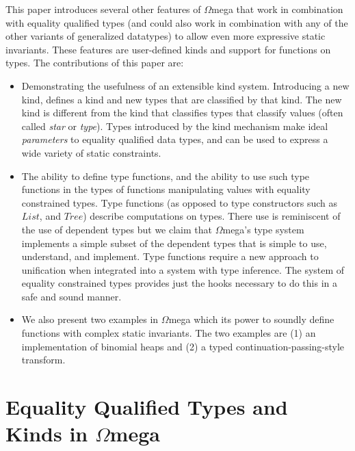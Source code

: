 \documentclass[10pt]{article}
\newcommand{\Conid}[1]{\mathit{#1}}
\newcommand{\Wmega}{\ensuremath{\Omega}mega}
\newcommand{\edit}[1]{\marginpar{\raggedright\footnotesize{#1}}}
\begin{document}
This paper introduces several other features of \Wmega{} that work in
combination with equality qualified types (and could also work in combination
with any of the other variants of generalized datatypes) to allow even more
expressive static invariants. These features are user-defined kinds and 
support for functions on types.  The contributions of this paper are:

\begin{itemize} 

\item Demonstrating the usefulness of an extensible kind system. Introducing a new
kind, defines a kind and new types that are classified by that kind.
The new kind is different from the kind that classifies types that
classify values (often called {\it star} or {\it type}). Types introduced
by the kind mechanism make ideal {\em parameters} to equality qualified
data types, and can be used to express a wide variety of static constraints.

\item The ability to define type functions, and the ability to use such
type functions in the types of functions manipulating values with
equality constrained types. Type functions (as opposed to type
constructors such as \ensuremath{\Conid{List}}, and \ensuremath{\Conid{Tree}}) describe computations
on types.  There use is reminiscent of the use of dependent types 
but we claim that \Wmega{}'s type system
implements a simple subset of the dependent types that is simple to
use, understand, and implement. Type functions require a new approach
to unification when integrated into a system with type inference. The
system of equality constrained types provides just the hooks necessary
to do this in a safe and sound manner.\edit{what is meant by "safe and sound"?}


\item We also present two examples in \Wmega{} which
its power to soundly define functions with complex static invariants. 
The two examples are (1) an implementation of binomial heaps and (2) a
typed continuation-passing-style transform.

\end{itemize}

\section{Equality Qualified Types and Kinds in \Wmega{}}\label{IntroOmega}
\end{document}

